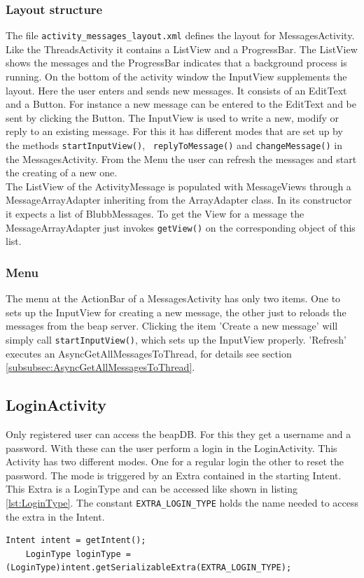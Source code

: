 \documentclass[12pt,a4paper,oneside]{report}
\newcommand{\beapDB}{beapDB}
\newcommand{\beapServer}{beap server}
\newcommand{\code}[1]{\lstinline{#1}}
\begin{document}
\subsubsection{Layout structure}
The file \code{activity_messages_layout.xml} defines the layout for MessagesActivity. Like the ThreadsActivity it contains a ListView and a ProgressBar. The ListView shows the messages and the ProgressBar indicates that a background process is running. On the bottom of the activity window the InputView supplements the layout. Here the user enters and sends new messages. It consists of an EditText and a Button. For instance a new message can be entered to the EditText and be sent by clicking the Button. 
The InputView is used to write a new, modify or reply to an existing message. For this it has different modes that are set up by the methods \code{startInputView()}, \code{ replyToMessage()} and \code{changeMessage()} in the MessagesActivity.
From the Menu the user can refresh the messages and start the creating of a new one. \\

The ListView of the ActivityMessage is populated with MessageViews through a MessageArrayAdapter inheriting from the ArrayAdapter class. 
In its constructor it expects a list of BlubbMessages. To get the View for a message the MessageArrayAdapter just invokes \code{getView()} on the corresponding object of this list. 

\subsubsection{Menu}
The menu at the ActionBar of a MessagesActivity has only two items. One to sets up the InputView for creating a new message, the other just to reloads the messages from the \beapServer{}. Clicking the item 'Create a new message' will simply call \code{startInputView()}, which sets up the InputView properly. 'Refresh' executes an AsyncGetAllMessagesToThread, for details see section  \ref{subsubsec:AsyncGetAllMessagesToThread}.

\subsection{LoginActivity}
Only registered user can access the \beapDB{}. For this they get a username and a password. With these can the user perform a login in the LoginActivity. This Activity has two different modes. One for a regular login the other to reset the password. The mode is triggered by an Extra contained in the starting Intent. This Extra is a LoginType and can be accessed like shown in listing \ref{lst:LoginType}. The constant \code{EXTRA_LOGIN_TYPE} holds the name needed to access the extra in the Intent.
\lstset{language=java}
\begin{lstlisting}[caption=Accessing the LoginType., label=lst:LoginType]
	Intent intent = getIntent();
    LoginType loginType = (LoginType)intent.getSerializableExtra(EXTRA_LOGIN_TYPE);
\end{lstlisting}
\end{document}
